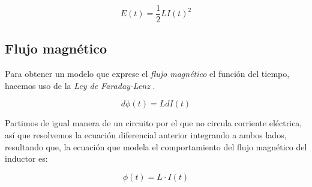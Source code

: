 \documentclass[../main.tex]{subfiles}
\begin{document}
\begin{equation}
    E(t) = \frac{1}{2}L I(t)^2
\end{equation}



\subsection{Flujo magnético}
\label{part::flujo_magnetico_inductor}
Para obtener un modelo que exprese el \textit{flujo magnético} el función del tiempo, hacemos uso de la \textit{Ley de Faraday-Lenz} . 

$$d \phi(t) = L d I(t)$$

Partimos de igual manera de un circuito por el que no circula corriente eléctrica, así que resolvemos la ecuación diferencial anterior integrando a ambos lados, resultando que, la ecuación que modela el comportamiento del flujo magnético del inductor es:

\begin{equation}
    \phi(t) = L \cdot I(t)
\end{equation}
\end{document}
